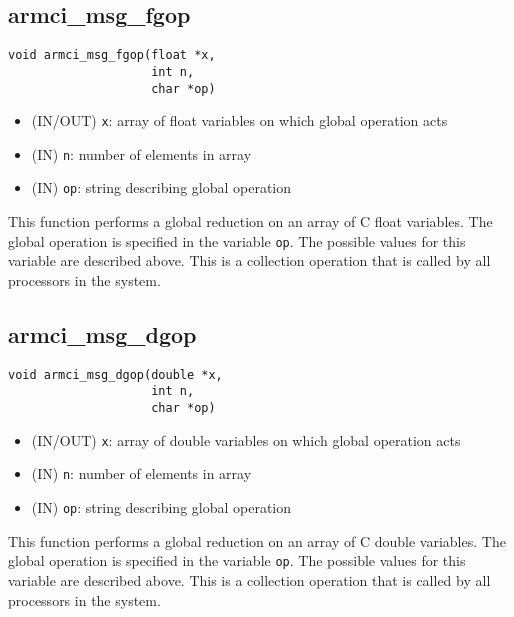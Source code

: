\documentclass[12pt]{article}
\begin{document}
\subsection{armci\_msg\_fgop}
\begin{verbatim}
void armci_msg_fgop(float *x,
                    int n,
                    char *op)
\end{verbatim}
\begin{itemize}
\item (IN/OUT) \texttt{x}: array of float variables on which global operation acts
\item (IN) \texttt{n}: number of elements in array
\item (IN) \texttt{op}: string describing global operation
\end{itemize}
This function performs a global reduction on an array of C float variables. The global
operation is specified in the variable \texttt{op}. The possible values for this
variable are described above. This is a collection operation that is called by
all processors in the system.

\subsection{armci\_msg\_dgop}
\begin{verbatim}
void armci_msg_dgop(double *x,
                    int n,
                    char *op)
\end{verbatim}
\begin{itemize}
\item (IN/OUT) \texttt{x}: array of double variables on which global operation acts
\item (IN) \texttt{n}: number of elements in array
\item (IN) \texttt{op}: string describing global operation
\end{itemize}
This function performs a global reduction on an array of C double variables. The global
operation is specified in the variable \texttt{op}. The possible values for this
variable are described above. This is a collection operation that is called by
all processors in the system.
\end{document}
